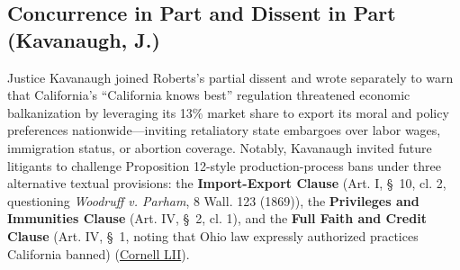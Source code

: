 \documentclass[12pt]{article}
\begin{document}
\subsection{Concurrence in Part and Dissent in Part (Kavanaugh, J.)}
Justice Kavanaugh joined Roberts's partial dissent and wrote separately to warn that California's ``California knows best'' regulation threatened economic balkanization by leveraging its 13\% market share to export its moral and policy preferences nationwide---inviting retaliatory state embargoes over labor wages, immigration status, or abortion coverage. Notably, Kavanaugh invited future litigants to challenge Proposition 12-style production-process bans under three alternative textual provisions: the \textbf{Import-Export Clause} (Art. I, \S~10, cl. 2, questioning \textit{Woodruff v. Parham}, 8 Wall. 123 (1869)), the \textbf{Privileges and Immunities Clause} (Art. IV, \S~2, cl. 1), and the \textbf{Full Faith and Credit Clause} (Art. IV, \S~1, noting that Ohio law expressly authorized practices California banned) (\href{https://www.law.cornell.edu/supremecourt/text/21-468}{Cornell LII}).
\end{document}
